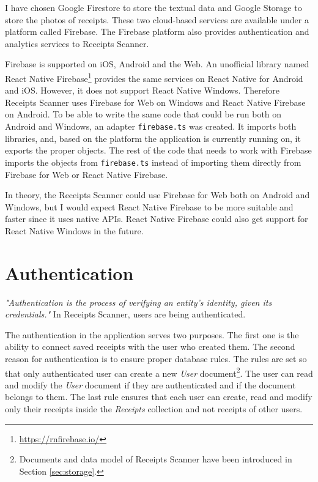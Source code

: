\documentclass[
  digital, %
  table,   %
  oneside, %
  lof,     %
  lot,     %
]{fithesis3}
\begin{document}
I have chosen Google Firestore to store the textual data and Google Storage to store the photos of receipts. These two cloud-based services are available under a platform called Firebase. The Firebase platform also provides authentication and analytics services to Receipts Scanner.

\label{phantom:firebase_adapter}
Firebase is supported on iOS, Android and the Web. An unofficial library named React Native Firebase\footnote{\url{https://rnfirebase.io/}} provides the same services on React Native for Android and iOS. However, it does not support React Native Windows. Therefore Receipts Scanner uses Firebase for Web on Windows and React Native Firebase on Android. To be able to write the same code that could be run both on Android and Windows, an adapter \texttt{firebase.ts} was created. It imports both libraries, and, based on the platform the application is currently running on, it exports the proper objects. The rest of the code that needs to work with Firebase imports the objects from \texttt{firebase.ts} instead of importing them directly from Firebase for Web or React Native Firebase.

In theory, the Receipts Scanner could use Firebase for Web both on Android and Windows, but I would expect React Native Firebase to be more suitable and faster since it uses native APIs. React Native Firebase could also get support for React Native Windows in the future.

\section{Authentication}
\label{ref:authentication}
\textit{"Authentication is the process of verifying an entity’s identity, given its credentials."} \cite{Cankaya2011Authentication} In Receipts Scanner, users are being authenticated.

The authentication in the application serves two purposes. The first one is the ability to connect saved receipts with the user who created them. The second reason for authentication is to ensure proper database rules. The rules are set so that only authenticated user can create a new \textit{User} document\footnote{Documents and data model of Receipts Scanner have been introduced in Section \ref{sec:storage}.}. The user can read and modify the \textit{User} document if they are authenticated and if the document belongs to them. The last rule ensures that each user can create, read and modify only their receipts inside the \textit{Receipts} collection and not receipts of other users.
\end{document}
